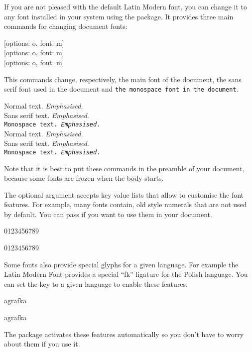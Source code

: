 If you are not pleased with the default Latin Modern font, you can change it to
any font installed in your system using the  package. It provides
three main commands for changing document fonts:
\begin{lscommand}
  [options: o, font: m] \\
  [options: o, font: m] \\
  [options: o, font: m]
\end{lscommand}
This commands change, respectively, the main font of the document, \textsf{the
  sans serif font used in the document} and \texttt{the monospace font in the
  document}.
\begin{example}
Normal text.
  \emph{Emphasised.} \\
\textsf{Sans serif text.
  \emph{Emphasised}.} \\
\texttt{Monospace text.
  \emph{Emphasised}.} \\

\setmainfont{Source Serif Pro}
\setsansfont{Source Sans Pro}
\setmonofont{Source Code Pro}
Normal text.
  \emph{Emphasised.} \\
\textsf{Sans serif text.
  \emph{Emphasised}.} \\
\texttt{Monospace text.
  \emph{Emphasised}.}
\end{example}
Note that it is best to put these commands in the preamble of your document,
because some fonts are frozen when the body starts.

The optional  argument accepts key value lists that allow to
customise the font features. For example, many fonts contain,
old style numerals that are not used by default. You can pass
 if you want to use them in your document.
\begin{example}
\setmainfont{Source Serif Pro}
0123456789

\setmainfont[
  Numbers=OldStyle,
]{Source Serif Pro}
0123456789
\end{example}

Some fonts also provide special glyphs for a given language. For example the
Latin Modern Font provides a special
\enquote{\setmainfont[Language=Polish]{Latin Modern Roman}fk} ligature for the
Polish language. You can set the  key to a given language to
enable these features.
\begin{example}
agrafka

\setmainfont[
  Language=Polish,
]{Latin Modern Roman}
agrafka
\end{example}
The  package activates these features automatically so you
don't have to worry about them if you use it.

